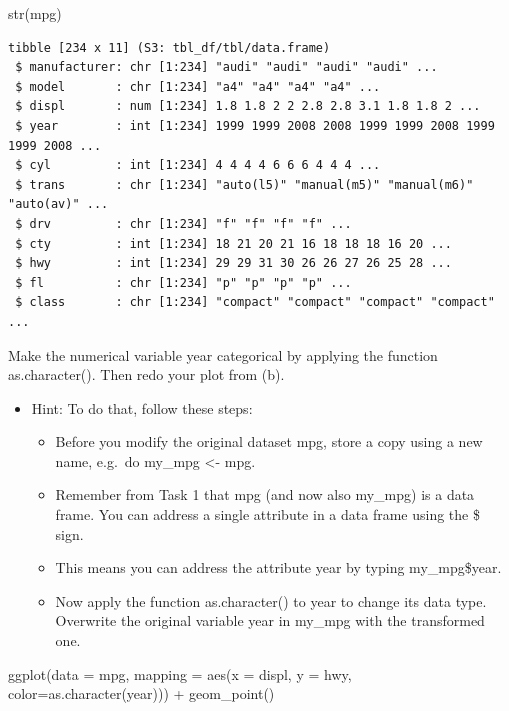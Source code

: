 \documentclass[
  letterpaper,
  DIV=11,
  numbers=noendperiod]{scrartcl}
\newenvironment{Shaded}{\begin{snugshade}}{\end{snugshade}}
\newcommand{\AttributeTok}[1]{\textcolor[rgb]{0.40,0.45,0.13}{#1}}
\newcommand{\FunctionTok}[1]{\textcolor[rgb]{0.28,0.35,0.67}{#1}}
\newcommand{\NormalTok}[1]{\textcolor[rgb]{0.00,0.23,0.31}{#1}}
\newcommand{\SpecialCharTok}[1]{\textcolor[rgb]{0.37,0.37,0.37}{#1}}
\begin{document}
\begin{Shaded}
\begin{Highlighting}[]
\FunctionTok{str}\NormalTok{(mpg)}
\end{Highlighting}
\end{Shaded}

\begin{verbatim}
tibble [234 x 11] (S3: tbl_df/tbl/data.frame)
 $ manufacturer: chr [1:234] "audi" "audi" "audi" "audi" ...
 $ model       : chr [1:234] "a4" "a4" "a4" "a4" ...
 $ displ       : num [1:234] 1.8 1.8 2 2 2.8 2.8 3.1 1.8 1.8 2 ...
 $ year        : int [1:234] 1999 1999 2008 2008 1999 1999 2008 1999 1999 2008 ...
 $ cyl         : int [1:234] 4 4 4 4 6 6 6 4 4 4 ...
 $ trans       : chr [1:234] "auto(l5)" "manual(m5)" "manual(m6)" "auto(av)" ...
 $ drv         : chr [1:234] "f" "f" "f" "f" ...
 $ cty         : int [1:234] 18 21 20 21 16 18 18 18 16 20 ...
 $ hwy         : int [1:234] 29 29 31 30 26 26 27 26 25 28 ...
 $ fl          : chr [1:234] "p" "p" "p" "p" ...
 $ class       : chr [1:234] "compact" "compact" "compact" "compact" ...
\end{verbatim}

Make the numerical variable year categorical by applying the function
as.character(). Then redo your plot from (b).

\begin{itemize}
\item
  Hint: To do that, follow these steps:

  \begin{itemize}
  \item
    Before you modify the original dataset mpg, store a copy using a new
    name, e.g.~do my\_mpg \textless- mpg.
  \item
    Remember from Task 1 that mpg (and now also my\_mpg) is a data
    frame. You can address a single attribute in a data frame using the
    \$ sign.
  \item
    This means you can address the attribute year by typing
    my\_mpg\$year.
  \item
    Now apply the function as.character() to year to change its data
    type. Overwrite the original variable year in my\_mpg with the
    transformed one.
  \end{itemize}
\end{itemize}

\begin{Shaded}
\begin{Highlighting}[]
\FunctionTok{ggplot}\NormalTok{(}\AttributeTok{data =}\NormalTok{ mpg, }
       \AttributeTok{mapping =} \FunctionTok{aes}\NormalTok{(}\AttributeTok{x =}\NormalTok{ displ, }
                     \AttributeTok{y =}\NormalTok{ hwy,}
                     \AttributeTok{color=}\FunctionTok{as.character}\NormalTok{(year))) }\SpecialCharTok{+}
  \FunctionTok{geom\_point}\NormalTok{()}
\end{Highlighting}
\end{Shaded}
\end{document}
